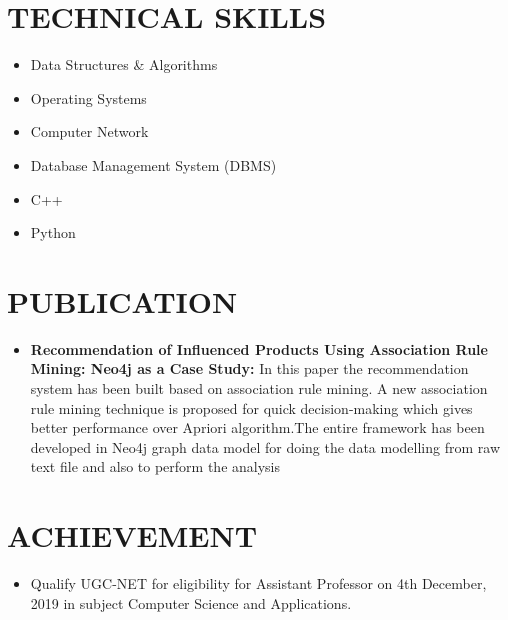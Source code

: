 \documentclass[letterpaper,11pt]{article}
\newcommand{\resumeSubHeadingListStart}{\begin{itemize}[leftmargin=0.0in, label={}]}
\newcommand{\resumeSubHeadingListEnd}{\end{itemize}}
\begin{document}
\section{TECHNICAL SKILLS}
        \begin{multicols}{4}
            \begin{itemize}[itemsep=-2pt, parsep=5pt]
                \item Data Structures \& Algorithms
                \item Operating Systems
                \item Computer Network
                \item Database Management System (DBMS)
                \item C++
                \item Python
            \end{itemize}
        \end{multicols}
        \vspace*{2.0\multicolsep}



\vspace{-10pt}
\section{PUBLICATION}
\begin{itemize}
\item \textbf{Recommendation of Influenced Products Using Association Rule Mining: Neo4j as a Case Study:} In this paper the recommendation system has been built based on association rule mining. A new association rule mining technique is proposed for quick decision-making which gives better performance over Apriori algorithm.The entire framework has been developed in Neo4j graph data model for doing the data modelling from raw text file and also to perform the analysis {\href{https://link.springer.com/article/10.1007/s42979-021-00460-8}{\raisebox{-0.1\height}\faExternalLink }}
\end{itemize}
    
 
 \vspace{-30pt}
\section{ACHIEVEMENT}
\begin{itemize} 
\item Qualify UGC-NET for eligibility for Assistant Professor on 4th December, 2019 in subject Computer Science and Applications.
\end{itemize} 
\end{document}
